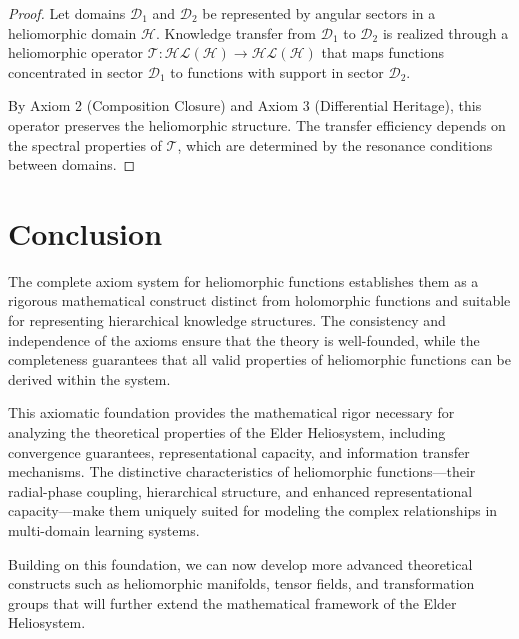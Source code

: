 \begin{proof}
Let domains $\mathcal{D}_1$ and $\mathcal{D}_2$ be represented by angular sectors in a heliomorphic domain $\mathcal{H}$. Knowledge transfer from $\mathcal{D}_1$ to $\mathcal{D}_2$ is realized through a heliomorphic operator $\mathcal{T}: \mathcal{HL}(\mathcal{H}) \rightarrow \mathcal{HL}(\mathcal{H})$ that maps functions concentrated in sector $\mathcal{D}_1$ to functions with support in sector $\mathcal{D}_2$.

By Axiom 2 (Composition Closure) and Axiom 3 (Differential Heritage), this operator preserves the heliomorphic structure. The transfer efficiency depends on the spectral properties of $\mathcal{T}$, which are determined by the resonance conditions between domains.
\end{proof}

\section{Conclusion}

The complete axiom system for heliomorphic functions establishes them as a rigorous mathematical construct distinct from holomorphic functions and suitable for representing hierarchical knowledge structures. The consistency and independence of the axioms ensure that the theory is well-founded, while the completeness guarantees that all valid properties of heliomorphic functions can be derived within the system.

This axiomatic foundation provides the mathematical rigor necessary for analyzing the theoretical properties of the Elder Heliosystem, including convergence guarantees, representational capacity, and information transfer mechanisms. The distinctive characteristics of heliomorphic functions—their radial-phase coupling, hierarchical structure, and enhanced representational capacity—make them uniquely suited for modeling the complex relationships in multi-domain learning systems.

Building on this foundation, we can now develop more advanced theoretical constructs such as heliomorphic manifolds, tensor fields, and transformation groups that will further extend the mathematical framework of the Elder Heliosystem.